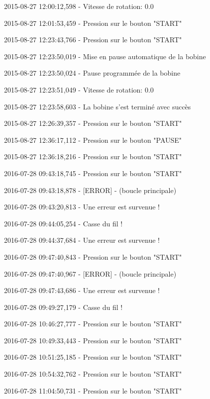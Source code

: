 \documentclass[a4paper, 11pt]{article}
\begin{document}
2015-08-27 12\string:00\string:12,598 - Vitesse de rotation\string: 0.0

2015-08-27 12\string:01\string:53,459 - Pression sur le bouton "START"

2015-08-27 12\string:23\string:43,766 - Pression sur le bouton "START"

2015-08-27 12\string:23\string:50,019 - Mise en pause automatique de la bobine

2015-08-27 12\string:23\string:50,024 - Pause programmée de la bobine

2015-08-27 12\string:23\string:51,049 - Vitesse de rotation\string: 0.0

2015-08-27 12\string:23\string:58,603 - La bobine s'est terminé avec succès

2015-08-27 12\string:26\string:39,357 - Pression sur le bouton "START"

2015-08-27 12\string:36\string:17,112 - Pression sur le bouton "PAUSE"

2015-08-27 12\string:36\string:18,216 - Pression sur le bouton "START"

2016-07-28 09\string:43\string:18,745 - Pression sur le bouton "START"

2016-07-28 09\string:43\string:18,878 - [ERROR] - (boucle principale)

2016-07-28 09\string:43\string:20,813 - Une erreur est survenue !

2016-07-28 09\string:44\string:05,254 - Casse du fil !

2016-07-28 09\string:44\string:37,684 - Une erreur est survenue !

2016-07-28 09\string:47\string:40,843 - Pression sur le bouton "START"

2016-07-28 09\string:47\string:40,967 - [ERROR] - (boucle principale)

2016-07-28 09\string:47\string:43,686 - Une erreur est survenue !

2016-07-28 09\string:49\string:27,179 - Casse du fil !

2016-07-28 10\string:46\string:27,777 - Pression sur le bouton "START"

2016-07-28 10\string:49\string:33,443 - Pression sur le bouton "START"

2016-07-28 10\string:51\string:25,185 - Pression sur le bouton "START"

2016-07-28 10\string:54\string:32,762 - Pression sur le bouton "START"

2016-07-28 11\string:04\string:50,731 - Pression sur le bouton "START"
\end{document}
